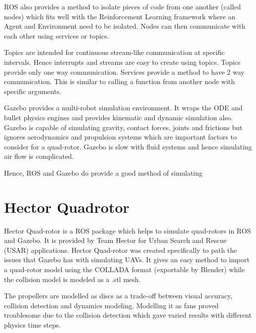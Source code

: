 \documentclass[hidelinks,BTech]{iitmdiss}
\begin{document}
ROS also provides a method to isolate pieces of code from one another (called nodes) which fits well with the Reinforcement Learning framework where an Agent and Environment need to be isolated. Nodes can then communicate with each other using services or topics.

Topics are intended for continuous stream-like communication at specific intervals. Hence interrupts and streams are easy to create using topics. Topics provide only one way communication. Services provide a method to have 2 way communication. This is similar to calling a function from another node with specific arguments.

Gazebo provides a multi-robot simulation environment. It wraps the ODE and bullet physics engines and provides kinematic and dynamic simulation also. Gazebo is capable of simulating gravity, contact forces, joints and frictions but ignores aerodynamics and propulsion systems which are important factors to consider for a quad-rotor. Gazebo is slow with fluid systems and hence simulating air flow is complicated.

Hence, ROS and Gazebo do provide a good method of simulating

\section{Hector Quadrotor}

Hector Quad-rotor \cite{HectorQuadrotor} is a ROS package which helps to simulate quad-rotors in ROS and Gazebo. It is provided by Team Hector for Urban Search and Rescue (USAR) applications. Hector Quad-rotor was created specifically to path the issues that Gazebo has with simulating UAVs. It gives an easy method to import a quad-rotor model using the COLLADA format (exportable by Blender) while the collision model is modeled as a .stl mesh.

The propellers are modelled as discs as a trade-off between visual accuracy, collision detection and dynamics modeling. Modelling it as fans proved troublesome due to the collision detection which gave varied results with different physics time steps.
\end{document}
